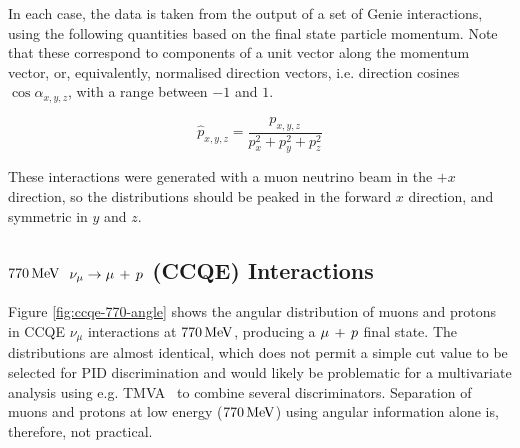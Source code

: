 In each case, the data is taken from the output of a set of Genie interactions, using the following quantities based on the final state particle momentum. Note that these correspond to components of a unit vector along the momentum vector, or, equivalently, normalised direction vectors, i.e. direction cosines $\cos\alpha_{x,y,z}$, with a range between $-1$ and $1$.

\begin{equation}\label{eqn:angular_variables}
    \hat{p}_{x,y,z} = \frac{p_{x,y,z}}{p_x^2 + p_y^2 + p_z^2}
\end{equation}

These interactions were generated with a muon neutrino beam in the $+x$ direction, so the distributions should be peaked in the forward $x$ direction, and symmetric in $y$ and $z$.

\subsection{$770\,\mathrm{MeV}$ $\nu_\mu \rightarrow \mu\,+\,p$ (CCQE) Interactions}
Figure \ref{fig:ccqe-770-angle} shows the angular distribution of muons and protons in \acs{CCQE} $\nu_\mu$ interactions at $770\,\mathrm{MeV}$, producing a $\mu\,+\,p$ final state. The distributions are almost identical, which does not permit a simple cut value to be selected for PID discrimination and would likely be problematic for a multivariate analysis using e.g. TMVA~\citep{TMVA} to combine several discriminators. Separation of muons and protons at low energy ($770\,\mathrm{MeV}$) using angular information alone is, therefore, not practical.

